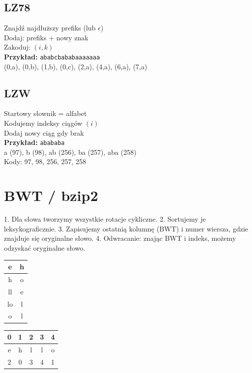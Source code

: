 \documentclass{../konspekt}
\begin{document}
\begin{multicols}{2}
\begin{multicols}{3}
    \vfill\null
    \columnbreak

    \subsection*{LZ78}
    \footnotesize
    Znajdź najdłuższy prefiks (lub $\epsilon$) \\
    Dodaj: prefiks + nowy znak \\
    Zakoduj: $(i,k)$ \\
    \textbf{Przykład:} \texttt{ababcbababaaaaaaa} \\
    (0,a), (0,b), (1,b), (0,c), (2,a), (4,a), (6,a), (7,a)

    \vfill\null
    \columnbreak

    \subsection*{LZW}
    \footnotesize
    Startowy słownik = alfabet \\
    Kodujemy indeksy ciągów $(i)$ \\
    Dodaj nowy ciąg gdy brak \\
    \textbf{Przykład:} \texttt{abababa} \\
    a (97), b (98), ab (256), ba (257), aba (258) \\
    Kody: 97, 98, 256, 257, 258
  \end{multicols}

  \vspace{-3em}

  \section*{BWT / bzip2}

  1. Dla słowa tworzymy wszystkie rotacje cykliczne.
  2. Sortujemy je leksykograficznie.
  3. Zapisujemy ostatnią kolumnę (BWT) i numer wiersza, gdzie
  znajduje się oryginalne słowo.
  4. Odwracanie: znając BWT i indeks, możemy odzyskać oryginalne słowo.

  \begin{center}
    \begin{tabular}{|c|c|}
      \hline
      e & h \\
      \hline
      \rowcolor{gray!25}
      h & o \\
      \hline
      ll & e \\
      \hline
      lo & l \\
      \hline
      o & l \\
      \hline
    \end{tabular}
    \quad
    \begin{tabular}{|c|c|c|c|c|}
      \hline
      \rowcolor{gray!25}
      0 & 1 & 2 & 3 & 4 \\
      \hline
      e & h & l & l & o \\
      \hline
      2 & 0 & 3 & 4 & 1 \\
      \hline
    \end{tabular}
  \end{center}


\end{multicols}
\end{document}
